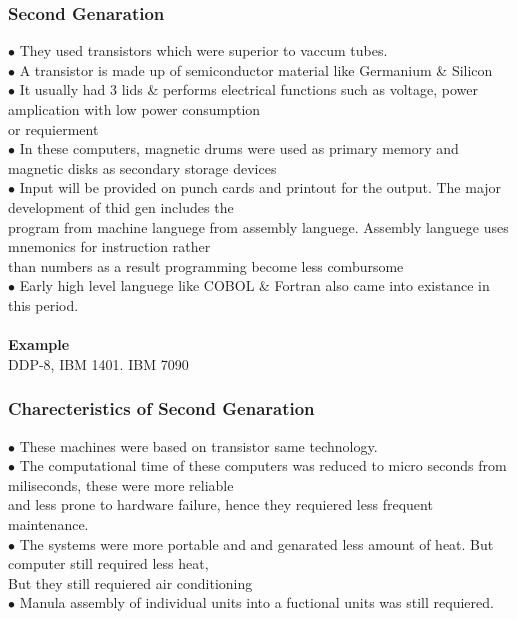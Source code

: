 \documentclass{article}
\begin{document}
	\subsubsection{Second Genaration}
	$\bullet$ They used transistors which were superior to vaccum tubes. \\
	$\bullet$ A transistor is made up of semiconductor material like Germanium \& Silicon \\
	$\bullet$ It usually had 3 lids \& performs electrical functions such as voltage, power amplication with low power consumption \\ \tabto{0.35cm}or requierment \\
	$\bullet$ In these computers, magnetic drums were used as primary memory and magnetic disks as secondary storage devices \\
	$\bullet$ Input will be provided on punch cards and printout for the output. The major development of thid gen includes the \\ \tabto{0.35cm}program from machine languege from assembly languege. Assembly languege uses mnemonics for instruction rather \\ \tabto{0.35cm}than numbers as a result programming become less combursome \\
	$\bullet$ Early high level languege like COBOL \& Fortran also came into existance in this period.
	\\ \\
	\textbf{Example} \\
	DDP-8, IBM 1401. IBM 7090
	
	\subsubsection*{Charecteristics of Second Genaration}
	$\bullet$ These machines were based on transistor same technology. \\
	$\bullet$ The computational time of these computers was reduced to micro seconds from miliseconds, these were more reliable \\ \tabto{0.35cm} and less prone to hardware failure, hence they requiered less frequent maintenance. \\
	$\bullet$ The systems were more portable and and genarated less amount of heat. But computer still required less heat, \\ \tabto{0.35cm} But they still requiered air conditioning \\
	$\bullet$ Manula assembly of individual units into a fuctional units was still requiered.
	
\end{document}
